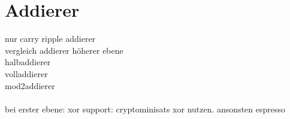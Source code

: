 \section{Addierer}
\label{sec:knf:addierer}


nur carry ripple addierer\\
vergleich addierer höherer ebene\\
halbaddierer\\
volladdierer\\
mod2addierer\\
~\\
bei erster ebene: xor support: cryptominisats xor nutzen. ansonsten espresso